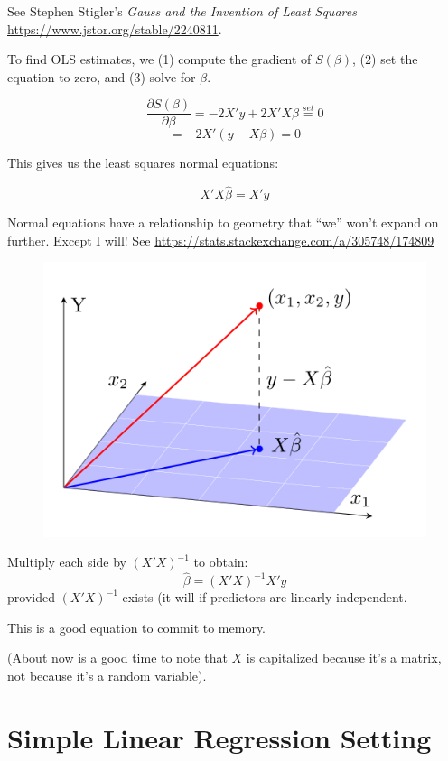 \documentclass[
  letterpaper,
  DIV=11,
  numbers=noendperiod]{scrreport}
\begin{document}
See Stephen Stigler's \emph{Gauss and the Invention of Least Squares}
\url{https://www.jstor.org/stable/2240811}.

To find OLS estimates, we (1) compute the gradient of \(S(\beta)\), (2)
set the equation to zero, and (3) solve for \(\beta\).

\[ \frac{\partial S(\beta)}{\partial \beta } = -2X'y + 2X'X\beta \stackrel{set}{=} 0\]
\[ = -2X'(y-X\beta) = 0\]

This gives us the least squares normal equations:

\[ X'X \hat \beta = X' y\]

Normal equations have a relationship to geometry that ``we'' won't
expand on further. Except I will! See
\url{https://stats.stackexchange.com/a/305748/174809}

\begin{figure}

{\centering \includegraphics[width=5in,height=\textheight]{week2/standalone_figures/normal_equation_projection/normal_equation_projection.svg}

}

\end{figure}

Multiply each side by \((X'X)^{-1}\) to obtain:
\[\hat \beta = (X'X)^{-1}X'y\] provided \((X'X)^{-1}\) exists (it will
if predictors are linearly independent.

This is a good equation to commit to memory.

(About now is a good time to note that \(X\) is capitalized because it's
a matrix, not because it's a random variable).

\hypertarget{simple-linear-regression-setting}{%
\section{Simple Linear Regression
Setting}\label{simple-linear-regression-setting}}
\end{document}
